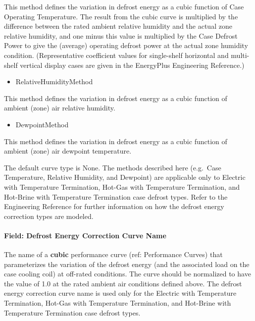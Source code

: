 This method defines the variation in defrost energy as a cubic function of Case Operating Temperature. The result from the cubic curve is multiplied by the difference between the rated ambient relative humidity and the actual zone relative humidity, and one minus this value is multiplied by the Case Defrost Power to give the (average) operating defrost power at the actual zone humidity condition. (Representative coefficient values for single-shelf horizontal and multi-shelf vertical display cases are given in the EnergyPlus Engineering Reference.)

\begin{itemize}
\tightlist
\item
  RelativeHumidityMethod
\end{itemize}

This method defines the variation in defrost energy as a cubic function of ambient (zone) air relative humidity.

\begin{itemize}
\tightlist
\item
  DewpointMethod
\end{itemize}

This method defines the variation in defrost energy as a cubic function of ambient (zone) air dewpoint temperature.

The default curve type is None. The methods described here (e.g.~Case Temperature, Relative Humidity, and Dewpoint) are applicable only to Electric with Temperature Termination, Hot-Gas with Temperature Termination, and Hot-Brine with Temperature Termination case defrost types. Refer to the Engineering Reference for further information on how the defrost energy correction types are modeled.

\paragraph{Field: Defrost Energy Correction Curve Name}\label{field-defrost-energy-correction-curve-name}

The name of a \textbf{cubic} performance curve (ref: Performance Curves) that parameterizes the variation of the defrost energy (and the associated load on the case cooling coil) at off-rated conditions. The curve should be normalized to have the value of 1.0 at the rated ambient air conditions defined above. The defrost energy correction curve name is used only for the Electric with Temperature Termination, Hot-Gas with Temperature Termination, and Hot-Brine with Temperature Termination case defrost types.

